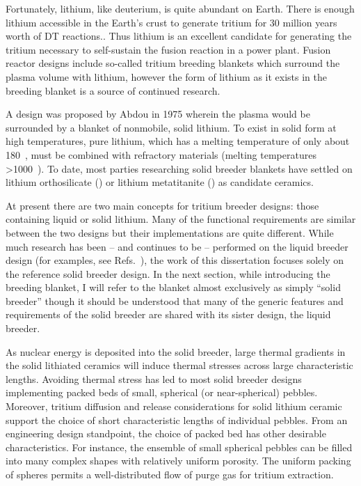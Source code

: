 Fortunately, lithium, like deuterium, is quite abundant on Earth. There is enough lithium accessible in the Earth's crust to generate tritium for 30 million years worth of DT reactions.\cite{Chen2011}. Thus lithium is an excellent candidate for generating the tritium necessary to self-sustain the fusion reaction in a power plant. Fusion reactor designs include so-called tritium breeding blankets which surround the plasma volume with lithium, however the form of lithium as it exists in the breeding blanket is a source of continued research.


A design was proposed by Abdou\etal\cite{Abdou1975} in 1975 wherein the plasma would be surrounded by a blanket of nonmobile, solid lithium. To exist in solid form at high temperatures, pure lithium, which has a melting temperature of only about 180~\celsius, must be combined with refractory materials (melting temperatures >1000~\celsius). To date, most parties researching solid breeder blankets have settled on lithium orthosilicate (\lis) or lithium metatitanite (\lit) as candidate ceramics.


At present there are two main concepts for tritium breeder designs: those containing liquid or solid lithium. Many of the functional requirements are similar between the two designs but their implementations are quite different. While much research has been -- and continues to be -- performed on the liquid breeder design (for examples, see Refs.~\cite{Hartmann1937,Hunt2006,Shercliff1953,Sommeria1982,Xv1937,Alfve1942}), the work of this dissertation focuses solely on the reference solid breeder design. In the next section, while introducing the breeding blanket, I will refer to the blanket almost exclusively as simply ``solid breeder'' though it should be understood that many of the generic features and requirements of the solid breeder are shared with its sister design, the liquid breeder.

As nuclear energy is deposited into the solid breeder, large thermal gradients in the solid lithiated ceramics will induce thermal stresses across large characteristic lengths. Avoiding thermal stress has led to most solid breeder designs implementing packed beds of small, spherical (or near-spherical) pebbles.\cite{Lulewicz2002, Mandal2012a, Tsuchiya1998, Cho2012} Moreover, tritium diffusion and release considerations for solid lithium ceramic support the choice of short characteristic lengths of individual pebbles. From an engineering design standpoint, the choice of packed bed has other desirable characteristics. For instance, the ensemble of small spherical pebbles can be filled into many complex shapes with relatively uniform porosity. The uniform packing of spheres permits a well-distributed flow of purge gas for tritium extraction. 

